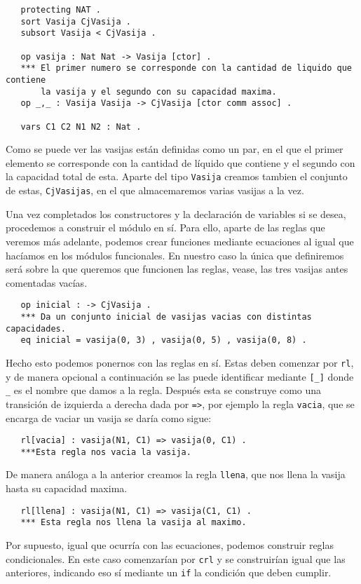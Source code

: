 {\codesize
\begin{verbatim}
   protecting NAT .
   sort Vasija CjVasija .
   subsort Vasija < CjVasija .

   op vasija : Nat Nat -> Vasija [ctor] .
   *** El primer numero se corresponde con la cantidad de liquido que contiene 
       la vasija y el segundo con su capacidad maxima.
   op _,_ : Vasija Vasija -> CjVasija [ctor comm assoc] .

   vars C1 C2 N1 N2 : Nat .
\end{verbatim}
}
Como se puede ver las vasijas están definidas como un par, en el que el primer elemento se corresponde con la cantidad de líquido que contiene y el segundo con la capacidad total de esta. Aparte del tipo \texttt{Vasija} creamos tambien el conjunto de estas, \texttt{CjVasijas}, en el que almacemaremos varias vasijas a la vez.\par 

Una vez completados los constructores y la declaración de variables si se desea, procedemos a construir el módulo en sí. Para ello, aparte de las reglas que veremos más adelante, podemos crear funciones mediante ecuaciones al igual que hacíamos en los módulos funcionales. En nuestro caso la única que definiremos será sobre la que queremos que funcionen las reglas, vease, las tres vasijas antes comentadas vacías.\par

{\codesize
\begin{verbatim}
   op inicial : -> CjVasija .
   *** Da un conjunto inicial de vasijas vacias con distintas capacidades.
   eq inicial = vasija(0, 3) , vasija(0, 5) , vasija(0, 8) .
\end{verbatim}
}

Hecho esto podemos ponernos con las reglas en sí. Estas deben comenzar por \verb"rl", y de manera opcional a continuación se las puede identificar mediante \verb"[_]" donde \verb"_" es el nombre que damos a la regla. Después esta se construye como una transición de izquierda a derecha dada por \verb"=>", por ejemplo la regla \texttt{vacia}, que se encarga de vaciar un vasija se daría como sigue:\par

{\codesize
\begin{verbatim}
   rl[vacia] : vasija(N1, C1) => vasija(0, C1) .
   ***Esta regla nos vacia la vasija.
\end{verbatim}
}
De manera análoga a la anterior creamos la regla \texttt{llena}, que nos llena la vasija hasta su capacidad maxima.\par
{\codesize
\begin{verbatim}
   rl[llena] : vasija(N1, C1) => vasija(C1, C1) .
   *** Esta regla nos llena la vasija al maximo.
\end{verbatim}
}
Por supuesto, igual que ocurría con las ecuaciones, podemos construir reglas condicionales. En este caso comenzarían por \verb"crl" y se construirían igual que las anteriores, indicando eso sí mediante un \texttt{if} la condición que deben cumplir.\par

